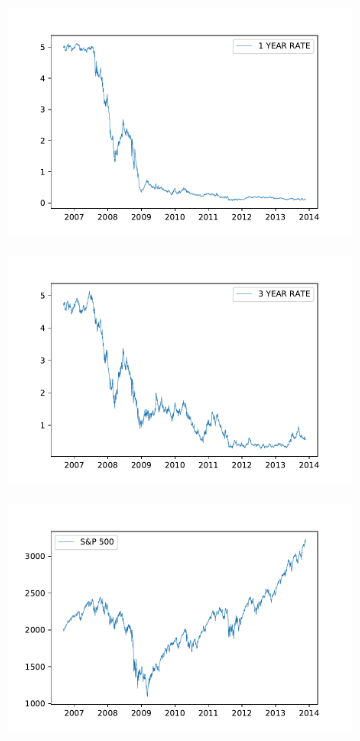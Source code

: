 \begin{figure}[H]
    \centering
    \begin{subfigure}[b]{0.32\textwidth}
    \includegraphics[width=\textwidth]{Figures/1yr.pdf}
    \end{subfigure}
    \begin{subfigure}[b]{0.32\textwidth}
    \includegraphics[width=\textwidth]{Figures/3yr.pdf}
    \end{subfigure}
    \begin{subfigure}[b]{0.32\textwidth}
    \includegraphics[width=\textwidth]{Figures/sp.pdf}

\end{subfigure}
\end{figure}
